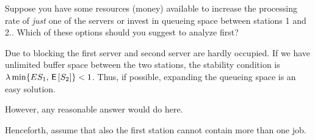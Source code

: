 
\begin{exercise}[201706]
Suppose you have some resources (money) available to increase the processing rate of \emph{just} one of the servers or invest in queueing space between stations 1 and 2.. Which of these options should you suggest to analyze first? 
\begin{solution}
Due to blocking the first server and second server are hardly occupied. 
If we have unlimited buffer space between the two stations, the stability condition is 
$\lambda\min\{E{S_1}, \,\mathsf{E}\left[S_2\right]\}<1$. 
Thus, if possible, expanding the queueing space is an easy solution.

However, any reasonable answer would do here.
\end{solution}
\end{exercise}


Henceforth, assume that also the first station cannot contain more than one job. 

